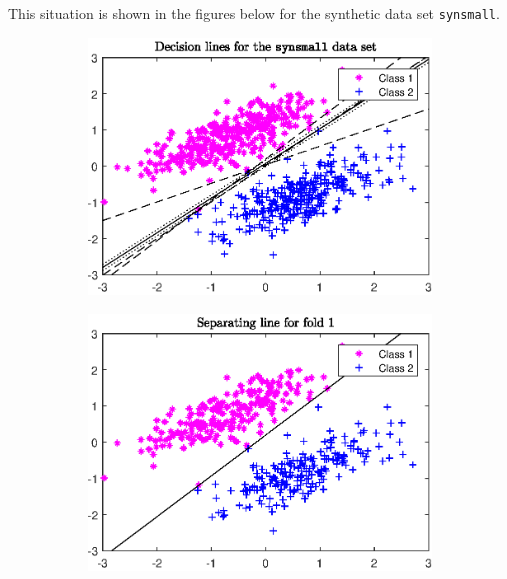 This situation is shown in the figures below for the synthetic data set \texttt{synsmall}.


\begin{figure}[ht]
	\begin{subfigure}[t]{0.49\textwidth}
		\includegraphics[width=\textwidth]{Pictures/Plots/plot_all_data_all_w.eps}
	\end{subfigure}
	\begin{subfigure}[t]{0.49\textwidth}
			\includegraphics[width=\textwidth]{Pictures/Plots/Fold_1.eps}
	\end{subfigure}
	\begin{subfigure}[t]{0.49\textwidth}

\end{subfigure}
\end{figure}
